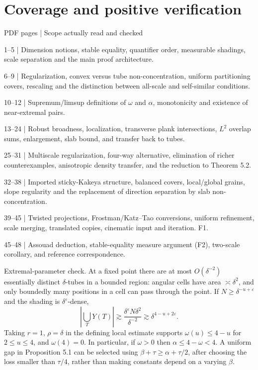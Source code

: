\documentclass[10pt]{article}
\begin{document}
\section*{Coverage and positive verification}
PDF pages | Scope actually read and checked\par
1–5 | Dimension notions, stable equality, quantifier order, measurable shadings, scale separation and the main proof architecture.\par
6–9 | Regularization, convex versus tube non-concentration, uniform partitioning covers, rescaling and the distinction between all-scale and self-similar conditions.\par
10–12 | Supremum/limsup definitions of \(\omega\) and \(\alpha\), monotonicity and existence of near-extremal pairs.\par
13–24 | Robust broadness, localization, transverse plank intersections, \(L^2\) overlap sums, enlargement, slab bound, and transfer back to tubes.\par
25–31 | Multiscale regularization, four-way alternative, elimination of richer counterexamples, anisotropic density transfer, and the reduction to Theorem 5.2.\par
32–38 | Imported sticky-Kakeya structure, balanced covers, local/global grains, slope regularity and the replacement of direction separation by slab non-concentration.\par
39–45 | Twisted projections, Frostman/Katz–Tao conversions, uniform refinement, scale merging, translated copies, cinematic input and iteration. F1.\par
45–48 | Assouad deduction, stable-equality measure argument (F2), two-scale corollary, and reference correspondence.\par
Extremal-parameter check. At a fixed point there are at most \(O(\delta^{-2})\) essentially distinct \(\delta\)-tubes in a bounded region: angular cells have area \(\asymp\delta^2\), and only boundedly many positions in a cell can pass through the point. If \(N\geq\delta^{-u+\varepsilon}\) and the shading is \(\delta^\varepsilon\)-dense, \[\left|\bigcup_TY(T)\right|\gtrsim
 \frac{\delta^\varepsilon N\delta^2}{\delta^{-2}}
 \gtrsim\delta^{4-u+2\varepsilon}.\] Taking \(r=1\), \(\rho=\delta\) in the defining local estimate supports \(\omega(u)\leq4-u\) for \(2\leq u\leq4\), and \(\omega(4)=0\). In particular, if \(\omega>0\) then \(\alpha\leq4-\omega<4\). A uniform gap in Proposition 5.1 can be selected using \(\beta+\tau\geq\alpha+\tau/2\), after choosing the loss smaller than \(\tau/4\), rather than making constants depend on a varying \(\beta\).\par
\end{document}
